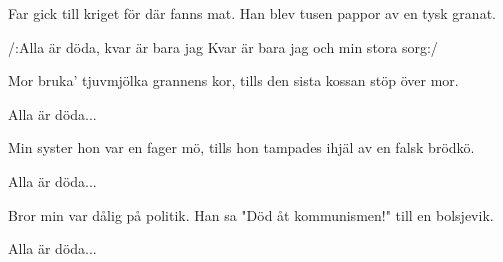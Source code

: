 


	
\beginverse*		%
Far gick till kriget för där fanns mat.
Han blev tusen pappor av en tysk granat.
\endverse			%

\beginchorus
/:Alla är döda, kvar är bara jag
Kvar är bara jag och min stora sorg:/
\endchorus

\beginverse*		%
Mor bruka' tjuvmjölka grannens kor,
tills den sista kossan stöp över mor.
\endverse			%

\beginchorus
Alla är döda...
\endchorus

\beginverse*		%
Min syster hon var en fager mö,
tills hon tampades ihjäl av en falsk brödkö.
\endverse			%

\beginchorus
Alla är döda...
\endchorus

\beginverse*		%
Bror min var dålig på politik.
Han sa "Död åt kommunismen!" till en bolsjevik.
\endverse			%

\beginchorus
Alla är döda...
\endchorus
\endsong			%

